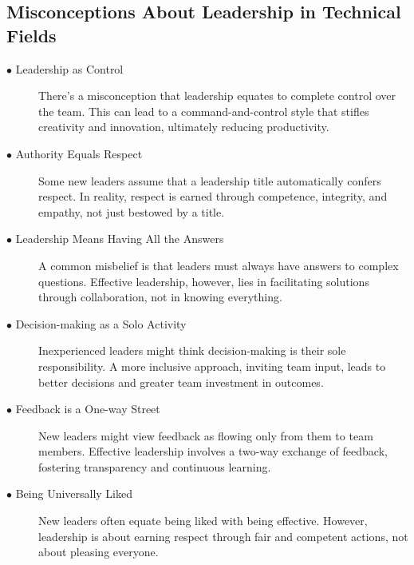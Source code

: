 \documentclass[runningheads]{llncs}
\begin{document}
\subsection{Misconceptions About Leadership in Technical Fields}

\begin{description}

 \item [$\bullet$ Leadership as Control] There's a misconception that leadership equates to complete control over the team. This can lead to a command-and-control style that stifles creativity and innovation, ultimately reducing productivity. \cite{ref_13}
  \\

 \item [$\bullet$ Authority Equals Respect] Some new leaders assume that a leadership title automatically confers respect. In reality, respect is earned through competence, integrity, and empathy, not just bestowed by a title. \cite{ref_15}
  \\

 \item [$\bullet$ Leadership Means Having All the Answers] A common misbelief is that leaders must always have answers to complex questions. Effective leadership, however, lies in facilitating solutions through collaboration, not in knowing everything. \cite{ref_16}
  \\

 \item [$\bullet$ Decision-making as a Solo Activity] Inexperienced leaders might think decision-making is their sole responsibility. A more inclusive approach, inviting team input, leads to better decisions and greater team investment in outcomes. \cite{ref_18}
  \\

 \item [$\bullet$ Feedback is a One-way Street] New leaders might view feedback as flowing only from them to team members. Effective leadership involves a two-way exchange of feedback, fostering transparency and continuous learning. \cite{ref_8}
  \\

 \item [$\bullet$ Being Universally Liked] New leaders often equate being liked with being effective. However, leadership is about earning respect through fair and competent actions, not about pleasing everyone. \cite{ref_7}
  \\


\end{description}
\end{document}
